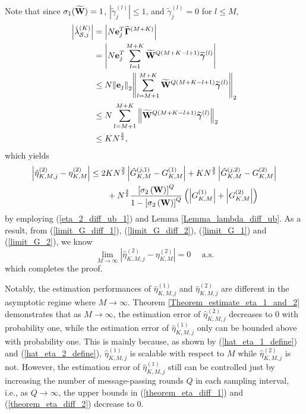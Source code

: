 \documentclass[11pt, draftclsnofoot, onecolumn]{IEEEtran}
\newcommand{\tbgamma}{{\widetilde{\boldsymbol{\gamma}}}}
\newcommand{\tbGamma}{{\widetilde{\boldsymbol{\Gamma}}}}
\newcommand{\tW}{{\widetilde{W}}}
\begin{document}
\begin{IEEEproof}
Note that since ${\sigma _1}( {\bf{\tW}} ) = 1$, $|{\widetilde{\gamma}}_j^{(l)}|\le 1$, and  ${\widetilde{\gamma}}_j^{(l)}=0$ for $l\le M$, 
\begin{align} \notag
\left| {\hat \lambda _{{\cal S},j}^{(K)}} \right| & = \left| {N{\bf{e}}_j^T{\tbGamma ^{\left( {M + K} \right)}}} \right|\\ \notag
& = \left| {N{\bf{e}}_j^T\sum\limits_{l = 1}^{M + K} {{{\bf{\tW}}^{Q\left( {M + K - l + 1} \right)}}{\tbgamma ^{(l)}}} } \right|\\ \notag
& \le N{\left\| {{{\bf{e}}_j}} \right\|_2}{\left\| {\sum\limits_{l = M + 1}^{M + K} {{{\bf{\tW}}^{Q\left( {M + K - l + 1} \right)}}{\tbgamma ^{(l)}}} } \right\|_2}\\ \notag
& \le N\sum\limits_{l = M + 1}^{M + K} {{{\left\| {{{\bf{\tW}}^{Q\left( {M + K - l + 1} \right)}}{\tbgamma ^{(l)}}} \right\|}_2}} \\
& \le K{N^{\frac{3}{2}}},
\end{align}
which yields
\begin{align} \notag
\left| {\hat \eta _{K,M,j}^{(2)} - \eta _{K,M}^{(2)}} \right| & \le 2K{N^{\frac{3}{2}}}\left| {\hat G_{K,M}^{(j,1)} - G_{K,M}^{(1)}} \right| + K{N^{\frac{3}{2}}}\left| {\hat G_{K,M}^{(j,2)} - G_{K,M}^{(2)}} \right| \\ \label{eta_2_diff_ub_2}
& \qquad + {N^{\frac{3}{2}}}\frac{{{{\left[ {{\sigma _2}\left( {\bf{W}} \right)} \right]}^Q}}}{{1 - {{\left[ {{\sigma _2}\left( {\bf{W}} \right)} \right]}^Q}}}\left( {\left| {G_{K,M}^{(1)}} \right| + \left| {G_{K,M}^{(2)}} \right|} \right)
\end{align}
by employing (\ref{eta_2_diff_ub_1}) and Lemma \ref{Lemma_lambda_diff_ub}. As a result, from (\ref{limit_G_diff_1}), (\ref{limit_G_diff_2}), (\ref{limit_G_1}) and (\ref{limit_G_2}), we know
\begin{equation}
\mathop {\lim }\limits_{M \to \infty } \left| {\hat \eta _{K,M,j}^{(2)} - \eta _{K,M}^{(2)}} \right| = 0 \quad \text{ a.s.}
\end{equation}
which completes the proof.
\end{IEEEproof}


Notably, the estimation   performances of $\hat{\eta} _{K,M,j}^{(1)}$ and $\hat{\eta}  _{K,M,j}^{(2)}$ are   different in the asymptotic regime where $M \to \infty$. Theorem \ref{Theorem_estimate_eta_1_and_2} demonstrates that as $M \to \infty$, the estimation error of $\hat{\eta}  _{K,M,j}^{(2)}$ decreases to $0$ with probability one, while the estimation error of $\hat{\eta} _{K,M,j}^{(1)}$ only can be bounded above with probability one. This is mainly because, as shown by (\ref{hat_eta_1_define}) and (\ref{hat_eta_2_define}), $\hat{\eta} _{K,M,j}^{(1)}$ is scalable with respect to $M$ while $\hat{\eta}  _{K,M,j}^{(2)}$ is not. 
However, the estimation error of $\hat{\eta} _{K,M,j}^{(1)}$ still can be controlled just by increasing the number of message-passing   rounds   $Q$ in each sampling interval, i.e., as $Q \to \infty$, the upper bounds in (\ref{theorem_eta_diff_1}) and (\ref{theorem_eta_diff_2}) decrease to $0$.
\end{document}
